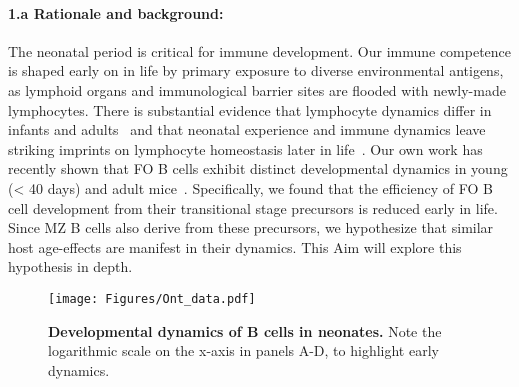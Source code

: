 \documentclass[11pt]{article}
\newcommand{\para}[1]{\vspace*{-4.5mm}\paragraph{#1}}
\begin{document}
\para{{1.a Rationale and background:}}
The neonatal period is critical for immune development.
Our immune competence is shaped early on in life by primary exposure to diverse environmental antigens, as lymphoid organs and immunological barrier sites are flooded with newly-made lymphocytes.
There is substantial evidence that lymphocyte dynamics differ in infants and adults~\cite{LeCampion_2002, Scho_nland_2003, Reynaldi_2019, Rane_2022} and that neonatal experience and immune dynamics leave striking imprints on lymphocyte homeostasis later in life~\cite{Farber_2013, Hogan_2019, Gaimann_2020, Davenport_2020}.  
Our own work has recently shown that FO B cells exhibit distinct developmental dynamics in young (< 40 days) and adult mice~\cite{Verheijen_2020}.
Specifically, we found that the efficiency of FO B cell development from their transitional stage precursors is reduced early in life. 
Since MZ B cells also derive from these precursors, we hypothesize that similar host age-effects are manifest in their dynamics.
This Aim will explore this hypothesis in depth.

\begin{wrapfigure}{r}{0.36\textwidth}
\centering
\vspace*{-5mm}
\texttt{[image: Figures/Ont\_data.pdf]}
\vspace*{-2mm}
\caption{\textbf{Developmental dynamics of B cells in neonates.} 
Note the logarithmic scale on the x-axis in panels A-D, to highlight early dynamics.
}
\vspace*{-5mm}
\label{fig:Ont_data}\end{wrapfigure}
\end{document}
